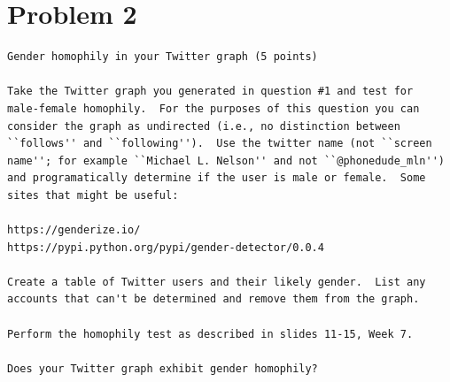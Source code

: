 

\section{Problem 2}
\label{part2}
\begin{verbatim}
Gender homophily in your Twitter graph (5 points)

Take the Twitter graph you generated in question #1 and test for
male-female homophily.  For the purposes of this question you can
consider the graph as undirected (i.e., no distinction between
``follows'' and ``following'').  Use the twitter name (not ``screen
name''; for example ``Michael L. Nelson'' and not ``@phonedude_mln'')
and programatically determine if the user is male or female.  Some
sites that might be useful:

https://genderize.io/
https://pypi.python.org/pypi/gender-detector/0.0.4

Create a table of Twitter users and their likely gender.  List any 
accounts that can't be determined and remove them from the graph.

Perform the homophily test as described in slides 11-15, Week 7.

Does your Twitter graph exhibit gender homophily?

\end{verbatim}

